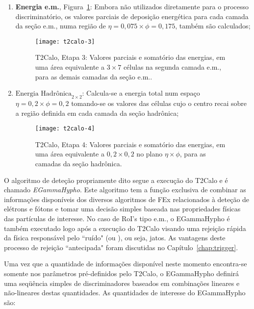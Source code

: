 \begin{enumerate}
\item \textbf{Energia e.m.}, Figura~\ref{fig:t2calo-3}: Embora não utilizados
diretamente para o processo discriminatório, os valores parciais de deposição
energética para cada camada da seção e.m., numa região de $\eta=0,075 \times
\phi=0,175$, também são calculados;

\begin{figure}
\begin{center}
\texttt{[image: t2calo-3]}
\end{center}
\caption{T2Calo, Etapa 3: Valores parciais e somatório das energias, em uma
área equivalente a $3\times7$ células na segunda camada e.m., para as demais
camadas da seção e.m..}
\label{fig:t2calo-3}
\end{figure}

\item \textbf{$\text{Energia Hadrônica}_{2 \times 2}$}: Calcula-se a energia
total num espaço $\eta=0,2 \times \phi=0,2$ tomando-se os valores das células
cujo o centro recai sobre a região definida em cada camada da seção hadrônica;

\begin{figure}
\begin{center}
\texttt{[image: t2calo-4]}
\end{center}
\caption{T2Calo, Etapa 4: Valores parciais e somatório das energias, em uma
área equivalente a $0,2\times0,2$ no plano $\eta\times\phi$, para as camadas
da seção hadrônica.} 
\label{fig:t2calo-4}
\end{figure}

\end{enumerate}

O algoritmo de deteção propriamente dito segue a execução do T2Calo e é
chamado \emph{EGammaHypho}. Este algoritmo tem a função exclusiva de combinar
as informações disponíveis dos diversos algoritmos de FEx relacionados à
deteção de elétrons e fótons e tomar uma decisão simples baseada nas
propriedades físicas das partículas de interesse. No caso de RoI's tipo e.m.,
o EGammaHypho é também executado logo após a execução do T2Calo visando uma
rejeição rápida da física responsável pelo ``ruído" (ou ), ou
seja, jatos. As vantagens deste processo de rejeição ``antecipada" foram
discutidas no Capítulo~\ref{chap:trigger}.

Uma vez que a quantidade de informações disponível neste momento encontra-se
somente nos parâmetros pré-definidos pelo T2Calo, o EGammaHypho definirá uma
seqüência simples de discriminadores baseados em combinações lineares e
não-lineares destas quantidades. As quantidades de interesse do EGammaHypho
são: 

